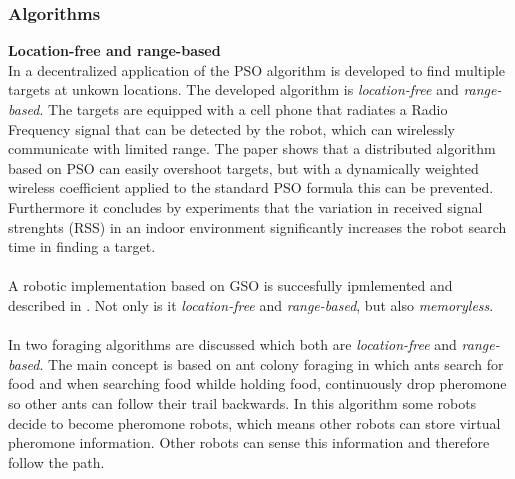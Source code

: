 \subsubsection{Algorithms}
	\textbf{Location-free and range-based}\\
	In \cite{derr2009multi} a decentralized application of the PSO algorithm is developed to find multiple targets at unkown locations. 
	The developed algorithm is \emph{location-free} and \emph{range-based}.
	The targets are equipped with a cell phone that radiates a Radio Frequency signal that can be detected by the robot, which can wirelessly communicate with limited range. 
	The paper shows that a distributed algorithm based on PSO can easily overshoot targets, but with a dynamically weighted wireless coefficient applied to the standard PSO formula this can be prevented. Furthermore it concludes by experiments that the variation in received signal strenghts (RSS) in an indoor environment significantly increases the robot search time in finding a target.\\
	\\
	A robotic implementation based on GSO is succesfully ipmlemented and described in \cite{krishnanand2006glowworm}. Not only is it \emph{location-free} and \emph{range-based}, but also \emph{memoryless}.\\
	\\
	In \cite{hoff2010two} two foraging algorithms are discussed which both are \emph{location-free} and \emph{range-based}. 
	The main concept is based on ant colony foraging in which ants search for food and when searching food whilde holding food, continuously drop pheromone so other ants can follow their trail backwards.
	In this algorithm some robots decide to become pheromone robots, which means other robots can store virtual pheromone information.
	Other robots can sense this information and therefore follow the path.
